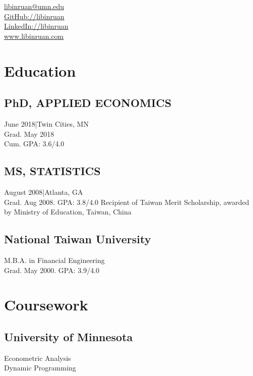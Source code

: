\documentclass[]{hieudo-build}
\begin{document}
%
%
{
	\faEnvelope \href{mailto:libinruan@umn.edu}{ libinruan@umn.edu}\\
	\faGithub \href{https://github.com/libinruan}{   GitHub://libinruan}\\
	\faLinkedinSquare \href{https://www.linkedin.com/in/libinruan}{ LinkedIn://libinruan} \\
    \faHome \href{https://libinruan.com}{ www.libinruan.com}
}
    
%
%
\begin{minipage}[t]{0.34\textwidth} 

\section{Education} 
\subsection{PhD, APPLIED ECONOMICS}
June 2018|Twin Cities, MN\\
Grad. May 2018 \\
Cum. GPA: 3.6/4.0\\
\sectionsep
\subsection{MS, STATISTICS}
August 2008|Atlanta, GA\\
Grad. Aug 2008. GPA: 3.8/4.0
Recipient of Taiwan Merit Scholarship, awarded by Ministry of Education, Taiwan, China
\sectionsep
\subsection{National Taiwan University}
M.B.A. in Financial Engineering \\
Grad. May 2000. GPA: 3.9/4.0

\section{Coursework}
\subsection{University of Minnesota}
Econometric Analysis \\
Dynamic Programming \\
\sectionsep

\end{minipage}
\end{document}
